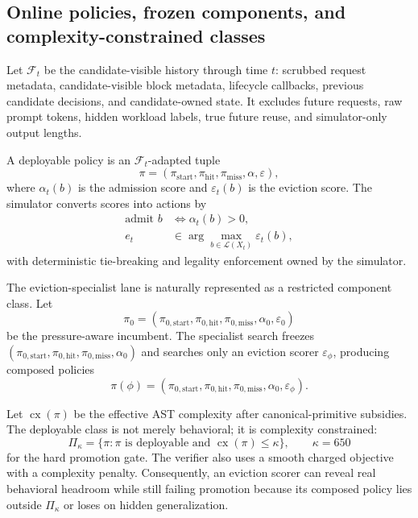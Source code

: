 \documentclass[11pt]{article}
\begin{document}
\subsection{Online policies, frozen components, and complexity-constrained classes}

Let \(\mathcal F_t\) be the candidate-visible history through time \(t\): scrubbed
request metadata, candidate-visible block metadata, lifecycle callbacks, previous
candidate decisions, and candidate-owned state.  It excludes future requests, raw
prompt tokens, hidden workload labels, true future reuse, and simulator-only output
lengths.

A deployable policy is an \(\mathcal F_t\)-adapted tuple
\begin{equation}
  \pi=(\pi_{\mathrm{start}},\pi_{\mathrm{hit}},\pi_{\mathrm{miss}},
       \alpha,\varepsilon),
\end{equation}
where \(\alpha_t(b)\) is the admission score and \(\varepsilon_t(b)\) is the eviction
score.  The simulator converts scores into actions by
\begin{align}
  \text{admit } b &\Longleftrightarrow \alpha_t(b)>0,\\
  e_t &\in \arg\max_{b\in\mathcal L(X_t)}\varepsilon_t(b),
\end{align}
with deterministic tie-breaking and legality enforcement owned by the simulator.

The eviction-specialist lane is naturally represented as a restricted component class.
Let
\begin{equation}
  \pi_0=(\pi_{0,\mathrm{start}},\pi_{0,\mathrm{hit}},\pi_{0,\mathrm{miss}},
       \alpha_0,\varepsilon_0)
\end{equation}
be the pressure-aware incumbent.  The specialist search freezes
\((\pi_{0,\mathrm{start}},\pi_{0,\mathrm{hit}},\pi_{0,\mathrm{miss}},\alpha_0)\) and
searches only an eviction scorer \(\varepsilon_\phi\), producing composed policies
\begin{equation}
  \pi(\phi)=
  (\pi_{0,\mathrm{start}},\pi_{0,\mathrm{hit}},\pi_{0,\mathrm{miss}},
   \alpha_0,\varepsilon_\phi).
\end{equation}

Let \(\operatorname{cx}(\pi)\) be the effective AST complexity after canonical-primitive
subsidies.  The deployable class is not merely behavioral; it is complexity constrained:
\begin{equation}
  \Pi_\kappa=\{\pi:\pi\text{ is deployable and }\operatorname{cx}(\pi)\le \kappa\},
  \qquad \kappa=650
\end{equation}
for the hard promotion gate.  The verifier also uses a smooth charged objective with a
complexity penalty.  Consequently, an eviction scorer can reveal real behavioral
headroom while still failing promotion because its composed policy lies outside
\(\Pi_\kappa\) or loses on hidden generalization.
\end{document}
